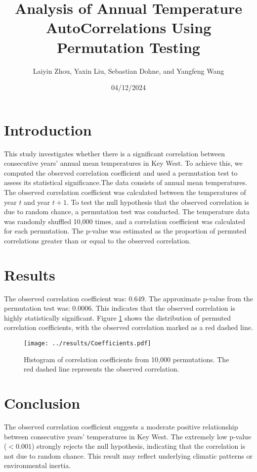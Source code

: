 \documentclass[a4paper,10pt]{article}
\title{\textbf{Analysis of Annual Temperature AutoCorrelations Using Permutation Testing}}
\author{Laiyin Zhou, Yaxin Liu, Sebastian Dohne, and Yangfeng Wang}
\date{04/12/2024}
\begin{document}
\maketitle
\section*{Introduction}
This study investigates whether there is a significant correlation between consecutive years' annual mean temperatures in Key West. To achieve this, we computed the observed correlation coefficient and used a permutation test to assess its statistical significance.The data consists of annual mean temperatures. The observed correlation coefficient was calculated between the temperatures of year \( t \) and year \( t+1 \). To test the null hypothesis that the observed correlation is due to random chance, a permutation test was conducted. The temperature data was randomly shuffled 10,000 times, and a correlation coefficient was calculated for each permutation. The p-value was estimated as the proportion of permuted correlations greater than or equal to the observed correlation.
\section*{Results}
The observed correlation coefficient was: 0.649.
The approximate p-value from the permutation test was: 0.0006.
This indicates that the observed correlation is highly statistically significant. Figure \ref{fig:histogram} shows the distribution of permuted correlation coefficients, with the observed correlation marked as a red dashed line.
\begin{figure}[h!]
    \centering
    \texttt{[image: ../results/Coefficients.pdf]}
    \caption{Histogram of correlation coefficients from 10,000 permutations. The red dashed line represents the observed correlation.}
    \label{fig:histogram}
\end{figure}
\section*{Conclusion}
The observed correlation coefficient suggests a moderate positive relationship between consecutive years' temperatures in Key West. The extremely low p-value (\(< 0.001\)) strongly rejects the null hypothesis, indicating that the correlation is not due to random chance. This result may reflect underlying climatic patterns or environmental inertia.
\immediate{}
\end{document}
